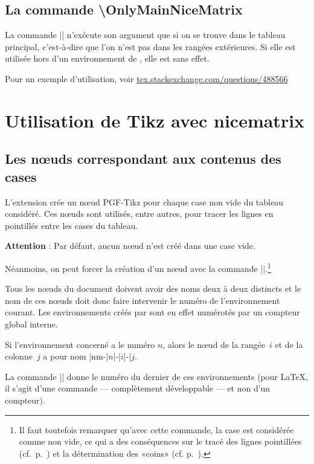 \documentclass[dvipsnames]{article}%
\begin{document}
\subsection{La commande \textbackslash OnlyMainNiceMatrix}

La commande |\OnlyMainNiceMatrix| n'exécute son argument que si on se trouve
dans le tableau principal, c'est-à-dire que l'on n'est pas dans les rangées
extérieures. Si elle est utilisée hors d'un environnement de ,
elle est sans effet. 

Pour un exemple d'utilisation, voir \url{tex.stackexchange.com/questions/488566} 


\section{Utilisation de Tikz avec nicematrix}

\label{name}\label{PGF-nodes}


\subsection{Les nœuds correspondant aux contenus des cases}

L'extension  crée un nœud PGF-Tikz pour chaque case non vide
du tableau considéré. Ces nœuds sont utilisés, entre autres, pour tracer les
lignes en pointillés entre les cases du tableau.

\smallskip
\textbf{Attention} : Par défaut, aucun nœud n'est créé dans une case vide.

\smallskip
Néanmoins, on peut forcer la création d'un nœud avec la commande |\NotEmpty|.\footnote{Il faut toutefois remarquer qu'avec cette commande, la
  case est considérée comme non vide, ce qui a des conséquences sur le tracé des
lignes pointillées (cf.~p.~\pageref{Cdots}) et la détermination des «coins»
(cf. p.~\pageref{corners}).}

\medskip
Tous les nœuds du document doivent avoir des noms deux à deux distincts et le
nom de ces nœuds doit donc faire intervenir le numéro de l'environnement
courant. Les environnements créés par  sont en effet numérotés
par un compteur global interne.

\smallskip
Si l'environnement concerné a le numéro $n$, alors le nœud de la rangée~$i$ et
de la colonne~$j$ a pour nom |nm-|$n$|-|$i$|-|$j$.

\smallskip
La commande |\NiceMatrixLastEnv| donne le numéro du dernier de ces
environnements (pour LaTeX, il s'agit d'une commande — complètement développable
— et non d'un compteur).
\end{document}
